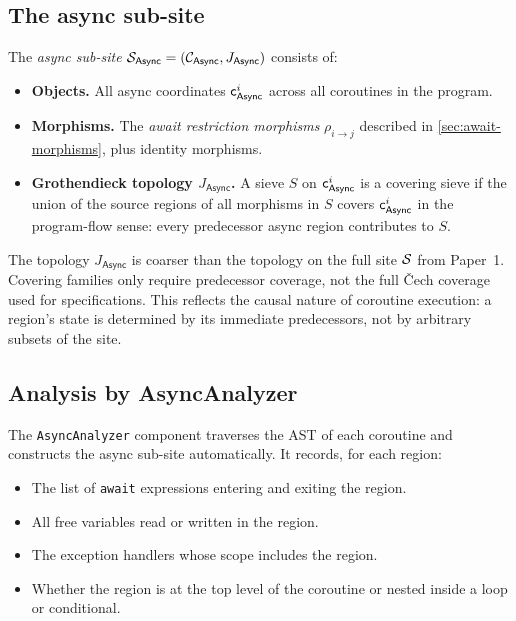 \documentclass[11pt]{article}
\newcommand{\Async}{\mathsf{Async}}          %
\newcommand{\AwaitMor}[2]{\rho_{#1 \to #2}} %
\newcommand{\asyncSite}{\Site_{\Async}}      %
\newcommand{\asyncCoord}[1]{\coord_{\Async}^{#1}} %
\begin{document}
\subsection{The async sub-site}

\begin{definition}\label{def:async-site}
The \emph{async sub-site} $\asyncSite = (\mathcal{C}_{\Async}, J_{\Async})$
consists of:
\begin{itemize}
  \item \textbf{Objects.}  All async coordinates $\asyncCoord{i}$ across all
        coroutines in the program.
  \item \textbf{Morphisms.}  The \emph{await restriction morphisms}
        $\AwaitMor{i}{j}$ described in \cref{sec:await-morphisms}, plus
        identity morphisms.
  \item \textbf{Grothendieck topology $J_{\Async}$.}  A sieve $S$ on
        $\asyncCoord{i}$ is a covering sieve if the union of the source regions
        of all morphisms in $S$ covers $\asyncCoord{i}$ in the program-flow
        sense: every predecessor async region contributes to $S$.
\end{itemize}
\end{definition}

\begin{remark}
The topology $J_{\Async}$ is coarser than the topology on the full site
$\mathcal{S}$ from Paper~1.  Covering families only require predecessor coverage,
not the full Čech coverage used for specifications.  This reflects the
causal nature of coroutine execution: a region's state is determined by its
immediate predecessors, not by arbitrary subsets of the site.
\end{remark}

\subsection{Analysis by AsyncAnalyzer}

The \texttt{AsyncAnalyzer} component traverses the AST of each coroutine
and constructs the async sub-site automatically.  It records, for each
region:
\begin{itemize}
  \item The list of \texttt{await} expressions entering and exiting the region.
  \item All free variables read or written in the region.
  \item The exception handlers whose scope includes the region.
  \item Whether the region is at the top level of the coroutine or nested
        inside a loop or conditional.
\end{itemize}
\end{document}

